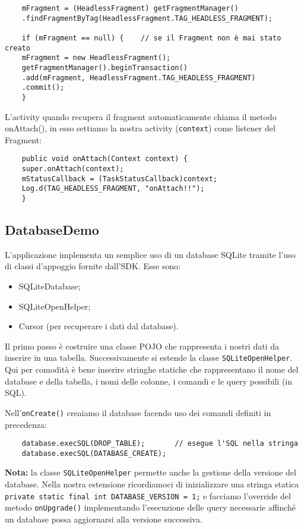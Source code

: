 \begin{itemize}
	\begin{lstlisting}
	mFragment = (HeadlessFragment) getFragmentManager()
	.findFragmentByTag(HeadlessFragment.TAG_HEADLESS_FRAGMENT);
	
	if (mFragment == null) {	// se il Fragment non è mai stato creato
	mFragment = new HeadlessFragment();
	getFragmentManager().beginTransaction()
	.add(mFragment, HeadlessFragment.TAG_HEADLESS_FRAGMENT)
	.commit();
	}
	\end{lstlisting}
	
	L'activity quando recupera il fragment automaticamente chiama il metodo onAttach(), in esso settiamo la nostra activity (\lstinline|context|) come listener del Fragment:
	
	\begin{lstlisting}
	public void onAttach(Context context) {
	super.onAttach(context);
	mStatusCallback = (TaskStatusCallback)context;
	Log.d(TAG_HEADLESS_FRAGMENT, "onAttach!!");
	}
	\end{lstlisting}
	
	
	
	\subsection{DatabaseDemo}
	L'applicazione implementa un semplice uso di un database SQLite tramite l'uso di classi d'appoggio fornite dall'SDK. Esse sono:
	\begin{itemize}
		\item SQLiteDatabase;
		\item SQLiteOpenHelper;
		\item Cursor (per recuperare i dati dal database).
	\end{itemize}
	
	Il primo passo è costruire una classe POJO che rappresenta i nostri dati da inserire in una tabella. Successivamente si estende la classe \lstinline|SQLiteOpenHelper|. Qui per comodità è bene inserire stringhe statiche che rappresentano il nome del database e della tabella, i nomi delle colonne, i comandi e le query possibili (in SQL).
	
	Nell'\lstinline|onCreate()| creaiamo il database facendo uso dei comandi definiti in precedenza:
	\begin{lstlisting}
	database.execSQL(DROP_TABLE);		// esegue l'SQL nella stringa
	database.execSQL(DATABASE_CREATE);
	\end{lstlisting}
	
	\textbf{Nota:} la classe \lstinline|SQLiteOpenHelper| permette anche la gestione della versione del database. Nella nostra estensione ricordiamoci di inizializzare una stringa statica \lstinline|private static final int DATABASE_VERSION = 1;| e facciamo l'override del metodo \lstinline|onUpgrade()| implementando l'esecuzione delle query necessarie affinché un database possa aggiornarsi alla versione successiva.
	

\end{itemize}
